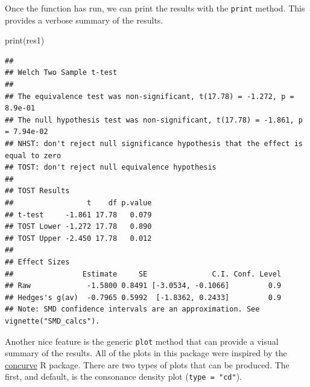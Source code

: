 \documentclass[]{interact}
\theoremstyle{plain}%
\theoremstyle{definition}
\theoremstyle{remark}
\newenvironment{Shaded}{\begin{snugshade}}{\end{snugshade}}
\newcommand{\AttributeTok}[1]{\textcolor[rgb]{0.77,0.63,0.00}{#1}}
\newcommand{\CommentTok}[1]{\textcolor[rgb]{0.56,0.35,0.01}{\textit{#1}}}
\newcommand{\DecValTok}[1]{\textcolor[rgb]{0.00,0.00,0.81}{#1}}
\newcommand{\FunctionTok}[1]{\textcolor[rgb]{0.00,0.00,0.00}{#1}}
\newcommand{\NormalTok}[1]{#1}
\newcommand{\OtherTok}[1]{\textcolor[rgb]{0.56,0.35,0.01}{#1}}
\newcommand{\SpecialCharTok}[1]{\textcolor[rgb]{0.00,0.00,0.00}{#1}}
\newcommand{\StringTok}[1]{\textcolor[rgb]{0.31,0.60,0.02}{#1}}
\begin{document}
\begin{Shaded}
\end{Shaded}

Once the function has run, we can print the results with the
\texttt{print} method. This provides a verbose summary of the results.

\begin{Shaded}
\begin{Highlighting}[]
\FunctionTok{print}\NormalTok{(res1)}
\end{Highlighting}
\end{Shaded}

\begin{verbatim}
## 
## Welch Two Sample t-test
## 
## The equivalence test was non-significant, t(17.78) = -1.272, p = 8.9e-01
## The null hypothesis test was non-significant, t(17.78) = -1.861, p = 7.94e-02
## NHST: don't reject null significance hypothesis that the effect is equal to zero 
## TOST: don't reject null equivalence hypothesis
## 
## TOST Results 
##                 t    df p.value
## t-test     -1.861 17.78   0.079
## TOST Lower -1.272 17.78   0.890
## TOST Upper -2.450 17.78   0.012
## 
## Effect Sizes 
##                Estimate     SE               C.I. Conf. Level
## Raw             -1.5800 0.8491 [-3.0534, -0.1066]         0.9
## Hedges's g(av)  -0.7965 0.5992  [-1.8362, 0.2433]         0.9
## Note: SMD confidence intervals are an approximation. See vignette("SMD_calcs").
\end{verbatim}

\newpage

Another nice feature is the generic \texttt{plot} method that can
provide a visual summary of the results. All of the plots in this
package were inspired by the
\href{https://cran.r-project.org/package=concurve}{concurve} R package.
There are two types of plots that can be produced. The first, and
default, is the consonance density plot (\texttt{type\ =\ "cd"}).
\end{document}

